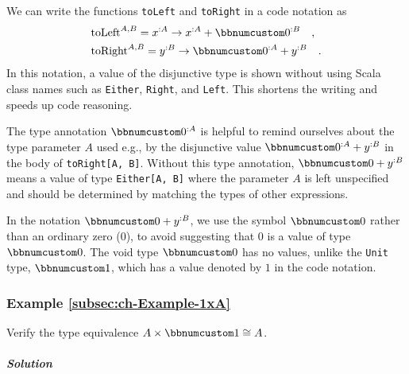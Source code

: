 \noindent We can write the functions \lstinline!toLeft! and \lstinline!toRight!
in a code notation as 
\begin{align*}
 & \text{toLeft}^{A,B}=x^{:A}\rightarrow x^{:A}+\bbnum 0^{:B}\quad,\\
 & \text{toRight}^{A,B}=y^{:B}\rightarrow\bbnum 0^{:A}+y^{:B}\quad.
\end{align*}
In this notation, a value of the disjunctive type is shown without
using Scala class names such as \lstinline!Either!, \lstinline!Right!,
and \lstinline!Left!. This shortens the writing and speeds up code
reasoning.

The type annotation $\bbnum 0^{:A}$ is helpful to remind ourselves
about the type parameter $A$ used e.g., by the disjunctive value
$\bbnum 0^{:A}+y^{:B}$ in the body of \lstinline!toRight[A, B]!.
Without this type annotation, $\bbnum 0+y^{:B}$ means a value of
type \lstinline!Either[A, B]! where the parameter $A$ is left unspecified
and should be determined by matching the types of other expressions.

In the notation $\bbnum 0+y^{:B}$, we use the symbol $\bbnum 0$
rather than an ordinary zero ($0$), to avoid suggesting that $0$
is a value of type $\bbnum 0$. The void type $\bbnum 0$ has no values,
unlike the \lstinline!Unit! type, $\bbnum 1$, which has a value
denoted by $1$ in the code notation.

\subsubsection{Example \label{subsec:ch-Example-1xA}\ref{subsec:ch-Example-1xA}}

Verify the type equivalence $A\times\bbnum 1\cong A$.

\subparagraph{Solution}


